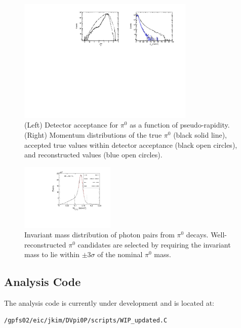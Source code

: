 \documentclass[letterpaper,12pt]{article}
\begin{document}
\begin{figure}[ht]
    \centering
    \includegraphics[width=0.75\textwidth]{Figures/pi0.pdf}
    \caption{(Left) Detector acceptance for $\pi^{0}$ as a function of pseudo-rapidity. (Right) Momentum distributions of the true $\pi^{0}$ (black solid line), accepted true values within detector acceptance (black open circles), and reconstructed values (blue open circles).}
\label{fig:pi0}
\end{figure}

\begin{figure}[ht]
    \centering
    \includegraphics[width=0.4\textwidth]{Figures/pi0_mass.pdf}
    \caption{Invariant mass distribution of photon pairs from $\pi^{0}$ decays. Well-reconstructed $\pi^{0}$ candidates are selected by requiring the invariant mass to lie within $\pm3\sigma$ of the nominal $\pi^{0}$ mass.}
\label{fig:pi0mass}
\end{figure}

\subsection{Analysis Code}\label{subsec:Analysis_Code}
The analysis code is currently under development and is located at:
\begin{verbatim}
/gpfs02/eic/jkim/DVpi0P/scripts/WIP_updated.C
\end{verbatim}
\end{document}
